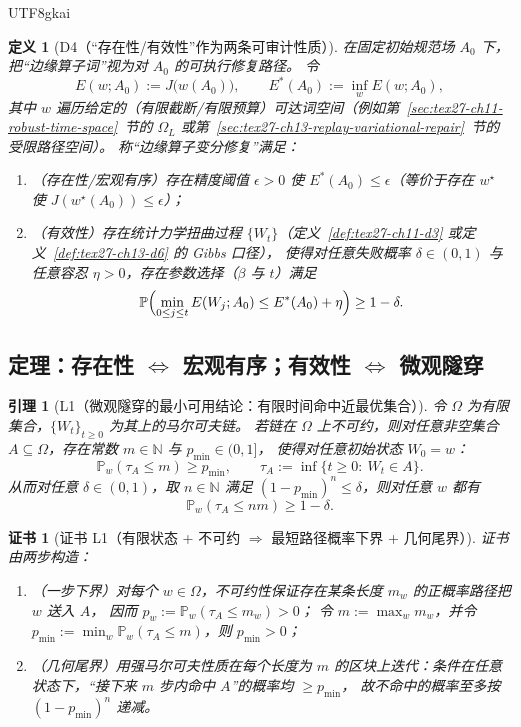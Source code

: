 \documentclass[12pt]{article}
\newtheorem{definition}{定义}[section]
\newtheorem{lemma}{引理}[section]
\newtheorem{Certificate}{证书}[section]
\newcommand{\NN}{\mathbb{N}}
\begin{document}
\begin{CJK*}{UTF8}{gkai}
\begin{definition}[D4（“存在性/有效性”作为两条可审计性质）]
\label{def:tex27-ch14-d4}
在固定初始规范场 $A_0$ 下，把“边缘算子词”视为对 $A_0$ 的可执行修复路径。
令
\[
  E(w;A_0):=J\bigl(w(A_0)\bigr),
  \qquad
  E^\ast(A_0):=\inf_{w}E(w;A_0),
\]
其中 $w$ 遍历给定的（有限截断/有限预算）可达词空间（例如第~\ref{sec:tex27-ch11-robust-time-space}~节的 $\Omega_L$ 或第~\ref{sec:tex27-ch13-replay-variational-repair}~节的受限路径空间）。
称“边缘算子变分修复”满足：
\begin{enumerate}
  \item（存在性/宏观有序）存在精度阈值 $\epsilon>0$ 使 $E^\ast(A_0)\le \epsilon$（等价于存在 $w^\star$ 使 $J(w^\star(A_0))\le\epsilon$）；
  \item（有效性）存在统计力学扭曲过程 $\{W_t\}$（定义~\ref{def:tex27-ch11-d3} 或定义~\ref{def:tex27-ch13-d6} 的 Gibbs 口径），
  使得对任意失败概率 $\delta\in(0,1)$ 与任意容忍 $\eta>0$，存在参数选择（$\beta$ 与 $t$）满足
  \[
    \mathbb{P}\Bigl(\min_{0\le j\le t}E(W_j;A_0)\le E^\ast(A_0)+\eta\Bigr)\ge 1-\delta.
  \]
\end{enumerate}
\end{definition}

\subsection{定理：存在性 $\Longleftrightarrow$ 宏观有序；有效性 $\Longleftrightarrow$ 微观隧穿}
\label{subsec:tex27-ch14-theorems}

\begin{lemma}[L1（微观隧穿的最小可用结论：有限时间命中近最优集合）]
\label{lem:tex27-ch14-l1}
令 $\Omega$ 为有限集合，$\{W_t\}_{t\ge 0}$ 为其上的马尔可夫链。
若链在 $\Omega$ 上不可约，则对任意非空集合 $A\subseteq \Omega$，存在常数 $m\in\NN$ 与 $p_{\min}\in(0,1]$，
使得对任意初始状态 $W_0=w$：
\[
  \mathbb{P}_w(\tau_A\le m)\ge p_{\min},
  \qquad
  \tau_A:=\inf\{t\ge 0:\ W_t\in A\}.
\]
从而对任意 $\delta\in(0,1)$，取 $n\in\NN$ 满足 $(1-p_{\min})^n\le \delta$，则对任意 $w$ 都有
\[
  \mathbb{P}_w(\tau_A\le n m)\ge 1-\delta.
\]
\end{lemma}

\begin{Certificate}[证书 L1（有限状态 + 不可约 $\Rightarrow$ 最短路径概率下界 + 几何尾界）]
\label{cert:tex27-ch14-l1}
证书由两步构造：
\begin{enumerate}
  \item（一步下界）对每个 $w\in\Omega$，不可约性保证存在某条长度 $m_w$ 的正概率路径把 $w$ 送入 $A$，
  因而 $p_w:=\mathbb{P}_w(\tau_A\le m_w)>0$；
  令 $m:=\max_w m_w$，并令 $p_{\min}:=\min_w \mathbb{P}_w(\tau_A\le m)$，则 $p_{\min}>0$；
  \item（几何尾界）用强马尔可夫性质在每个长度为 $m$ 的区块上迭代：条件在任意状态下，“接下来 $m$ 步内命中 $A$”的概率均 $\ge p_{\min}$，
  故不命中的概率至多按 $(1-p_{\min})^n$ 递减。
\end{enumerate}
\end{Certificate}


\end{CJK*}
\end{document}
